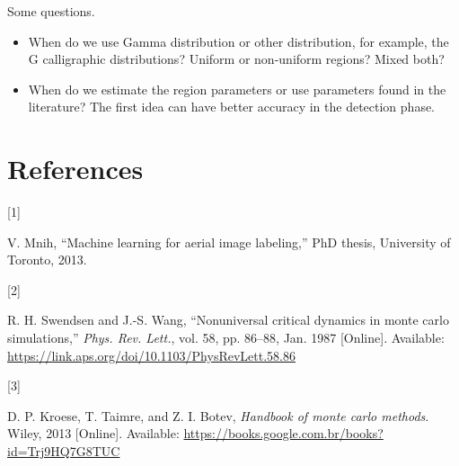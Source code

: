 \documentclass[
  journal,
]{IEEEtran}%
\newlength{\cslhangindent}
\newlength{\csllabelwidth}
\newenvironment{CSLReferences}[2] %
 {\begin{list}{}{%
  \setlength{\itemindent}{0pt}
  \setlength{\leftmargin}{0pt}
  \setlength{\parsep}{0pt}
  \ifodd #1
   \setlength{\leftmargin}{\cslhangindent}
   \setlength{\itemindent}{-1\cslhangindent}
  \fi
  \setlength{\itemsep}{#2\baselineskip}}}
 {\end{list}}
\newcommand{\CSLLeftMargin}[1]{\parbox[t]{\csllabelwidth}{\strut#1\strut}}
\newcommand{\CSLRightInline}[1]{\parbox[t]{\linewidth - \csllabelwidth}{\strut#1\strut}}
\begin{document}
Some questions.

\begin{itemize}
\item When do we use Gamma distribution or other distribution, for example, the G calligraphic distributions? Uniform or non-uniform regions? Mixed both?
\item When do we estimate the region parameters or use parameters found in the literature? The first idea can have better accuracy in the detection phase.
\end{itemize}

\begin{figure}


\caption{\label{fig-6}}

\end{figure}%

\section*{References}\label{references}

\label{refs}
\begin{CSLReferences}{0}{0}
\CSLLeftMargin{{[}1{]} }%
\CSLRightInline{V. Mnih, {``Machine learning for aerial image
labeling,''} PhD thesis, University of Toronto, 2013. }

\CSLLeftMargin{{[}2{]} }%
\CSLRightInline{R. H. Swendsen and J.-S. Wang, {``Nonuniversal critical
dynamics in monte carlo simulations,''} \emph{Phys. Rev. Lett.}, vol.
58, pp. 86--88, Jan. 1987 {[}Online{]}. Available:
\url{https://link.aps.org/doi/10.1103/PhysRevLett.58.86}}

\CSLLeftMargin{{[}3{]} }%
\CSLRightInline{D. P. Kroese, T. Taimre, and Z. I. Botev, \emph{Handbook
of monte carlo methods}. Wiley, 2013 {[}Online{]}. Available:
\url{https://books.google.com.br/books?id=Trj9HQ7G8TUC}}

\end{CSLReferences}
\end{document}
